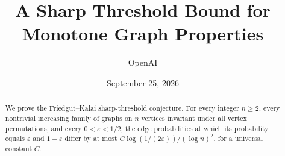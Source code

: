 \documentclass[11pt]{article}
\title{A Sharp Threshold Bound for\\Monotone Graph Properties}
\author{OpenAI}
\date{September 25, 2026}
\newcommand{\1}{\mathbf 1}
\theoremstyle{definition}
\theoremstyle{remark}
\numberwithin{equation}{section}
\begin{document}
\maketitle
\begin{abstract}
We prove the Friedgut--Kalai sharp-threshold conjecture. For every integer $n\ge2$, every nontrivial increasing family of graphs on $n$ vertices invariant under all vertex permutations, and every $0<\varepsilon<1/2$, the edge probabilities at which its probability equals $\varepsilon$ and $1-\varepsilon$ differ by at most $C\log(1/(2\varepsilon))/(\log n)^2$, for a universal constant $C$.
\end{abstract}




\clearpage

\end{document}
